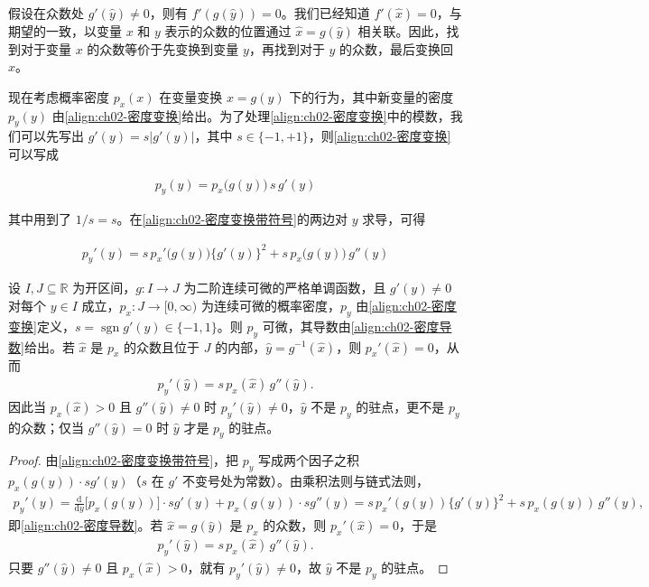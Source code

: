 \documentclass[../../main.tex]{subfiles}
\begin{document}
假设在众数处 $g'(\hat{y})\neq0$，则有 $f'(g(\hat{y}))=0$。我们已经知道 $f'(\hat{x})=0$，与期望的一致，以变量 $x$ 和 $y$ 表示的众数的位置通过 $\hat{x}=g(\hat{y})$ 相关联。因此，找到对于变量 $x$ 的众数等价于先变换到变量 $y$，再找到对于 $y$ 的众数，最后变换回 $x$。

现在考虑概率密度 $p_x(x)$ 在变量变换 $x=g(y)$ 下的行为，其中新变量的密度 $p_y(y)$ 由\eqref{align:ch02-密度变换}给出。为了处理\eqref{align:ch02-密度变换}中的模数，我们可以先写出 $g'(y)=s|g'(y)|$，其中 $s\in\{-1,+1\}$，则\eqref{align:ch02-密度变换}可以写成

\begin{align}
  p_y(y) = p_x\big(g(y)\big)\,s\,g'(y)
  \label{align:ch02-密度变换带符号}
\end{align}

其中用到了 $1/s=s$。在\eqref{align:ch02-密度变换带符号}的两边对 $y$ 求导，可得

\begin{align}
  p_y'(y) = s\,p_x'\big(g(y)\big)\big\{g'(y)\big\}^{2} + s\,p_x\big(g(y)\big)\,g''(y)
  \label{align:ch02-密度导数}
\end{align}

\begin{proposition}[密度的众数依赖于变量的选择]\label{proposition:ch02-密度众数依赖变量}
设 $I,J\subseteq\mathbb{R}$ 为开区间，$g:I\to J$ 为二阶连续可微的严格单调函数，且 $g'(y)\neq0$ 对每个 $y\in I$ 成立，$p_x:J\to[0,\infty)$ 为连续可微的概率密度，$p_y$ 由\eqref{align:ch02-密度变换}定义，$s=\operatorname{sgn}g'(y)\in\{-1,1\}$。则 $p_y$ 可微，其导数由\eqref{align:ch02-密度导数}给出。若 $\hat{x}$ 是 $p_x$ 的众数且位于 $J$ 的内部，$\hat{y}=g^{-1}(\hat{x})$，则 $p_x'(\hat{x})=0$，从而
\begin{align*}
  p_y'(\hat{y})=s\,p_x(\hat{x})\,g''(\hat{y}).
\end{align*}
因此当 $p_x(\hat{x})>0$ 且 $g''(\hat{y})\neq0$ 时 $p_y'(\hat{y})\neq0$，$\hat{y}$ 不是 $p_y$ 的驻点，更不是 $p_y$ 的众数；仅当 $g''(\hat{y})=0$ 时 $\hat{y}$ 才是 $p_y$ 的驻点。
\end{proposition}

\begin{proof}
由\eqref{align:ch02-密度变换带符号}，把 $p_y$ 写成两个因子之积 $p_x(g(y))\cdot s g'(y)$（$s$ 在 $g'$ 不变号处为常数）。由乘积法则与链式法则，
\begin{align*}
 p_y'(y) = \frac{\mathrm{d}}{\mathrm{d}y}\big[p_x(g(y))\big]\cdot s g'(y) + p_x(g(y))\cdot s g''(y)
 = s\,p_x'(g(y))\{g'(y)\}^{2} + s\,p_x(g(y))\,g''(y) ,
\end{align*}
即\eqref{align:ch02-密度导数}。若 $\hat{x}=g(\hat{y})$ 是 $p_x$ 的众数，则 $p_x'(\hat{x})=0$，于是
\begin{align*}
 p_y'(\hat{y}) = s\,p_x(\hat{x})\,g''(\hat{y}) .
\end{align*}
只要 $g''(\hat{y})\neq0$ 且 $p_x(\hat{x})>0$，就有 $p_y'(\hat{y})\neq0$，故 $\hat y$ 不是 $p_y$ 的驻点。
\end{proof}
\end{document}
